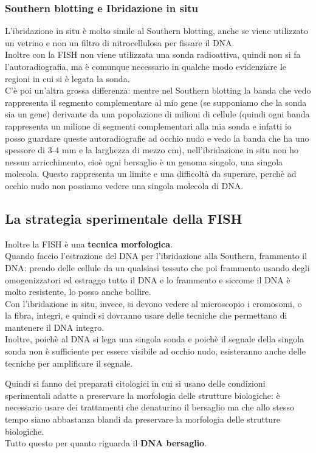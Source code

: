 \documentclass[11pt]{book}
\begin{document}
\subsubsection{Southern blotting e Ibridazione in situ}
L’ibridazione in situ è molto simile al Southern blotting, anche se viene utilizzato un vetrino e non un filtro di nitrocellulosa per fissare il DNA.\\
Inoltre con la FISH non viene utilizzata una sonda radioattiva, quindi non si fa l'autoradiografia, ma è comunque necessario in qualche modo evidenziare le regioni in cui si è legata la sonda.\\
C'è poi un'altra grossa differenza: mentre nel Southern blotting la banda che vedo rappresenta il segmento complementare al mio gene (se supponiamo che la sonda sia un gene) derivante da una popolazione di milioni di cellule (quindi ogni banda rappresenta un milione di segmenti complementari alla mia sonda e infatti io posso guardare queste autoradiografie ad occhio nudo e vedo la banda che ha uno spessore di 3-4 mm e la larghezza di mezzo cm), nell'ibridazione in situ non ho nessun arricchimento, cioè ogni bersaglio è un genoma singolo, una singola molecola. Questo rappresenta un limite e una difficoltà da superare, perchè ad occhio nudo non possiamo vedere una singola molecola di DNA. 

\subsection{La strategia sperimentale della FISH}
Inoltre la FISH è una \textbf{tecnica morfologica}.\\
Quando faccio l’estrazione del DNA per l’ibridazione alla Southern, frammento il DNA: prendo delle cellule da un qualsiasi tessuto che poi frammento usando degli omogenizzatori ed estraggo tutto il DNA e lo frammento e siccome il DNA è molto resistente, lo posso anche bollire.\\
Con l’ibridazione in situ, invece, si devono vedere al microscopio i cromosomi, o la fibra, integri, e quindi si dovranno usare delle tecniche che permettano di mantenere il DNA integro.\\
Inoltre, poichè al DNA si lega una singola sonda e poichè il segnale della singola sonda non è sufficiente per essere visibile ad occhio nudo, esisteranno anche delle tecniche per amplificare il segnale.

Quindi si fanno dei preparati citologici in cui si usano delle condizioni sperimentali adatte a preservare la morfologia delle strutture biologiche: è necessario usare dei trattamenti che denaturino il bersaglio ma che allo stesso tempo siano abbastanza blandi da preservare la morfologia delle strutture biologiche.\\
Tutto questo per quanto riguarda il \textbf{DNA bersaglio}.
\end{document}
